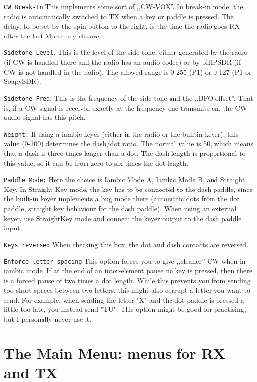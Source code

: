\documentclass[12pt]{book}
\def\rett#1{\texttt{\color{red}#1}}
\begin{document}
\rett{CW Break-In} This implements some sort of ,,CW-VOX''. In
break-in mode, the radio is automatically switched to TX when
a key or paddle is pressed. The delay, to be set by the spin
button to the right, is the time the radio goes RX after the
last Morse key closure.

\rett{Sidetone Level}. This is the level of the side tone,
either generated by the radio (if CW is handled there and the radio
has an audio codec) or
by piHPSDR (if CW is not handled in the radio). The allowed range
is 0-255 (P1) or 0-127 (P1 or SoapySDR).

\rett{Sidetone Freq}. This is the frequency of the side tone and the
,,BFO offset''. That is, if a CW signal is received exactly at the
frequency one transmits on, the CW audio signal has this pitch.

\rett{Weight:} If using a iambic keyer (either in the radio or
the builtin keyer), this value (0-100) determines the dash/dot ratio.
The normal value is 50, which means that a dash is three times longer
than a dot. The dash length is proportional to this value, so it can
be from zero to six times the dot length.

\rett{Paddle Mode:} Here the choice is Iambic Mode A, Iambic Mode B,
and  Straight Key. In Straight Key mode, the key has to be connected
to the dash paddle, since the built-in keyer implements a bug mode
there (automatic dots from the dot paddle, straight key behaviour
for the dash paddle). When using an external keyer, use StraightKey
mode and connect the keyer output to the dash paddle input.

\rett{Keys reversed} When checking this box, the dot and dash contacts
are reversed.

\rett{Enforce letter spacing} This option forces you to give ,,cleaner'' CW
when in iambic mode. If at the end of an inter-element pause no key is
pressed, then there is a forced pause of two times a dot length. While this
prevents you from sending too short spaces between two letters, this
might also corrupt a letter you want to send. For example, when sending
the letter "X" and the dot paddle is pressed a little too late, you
instead send "TU". This option might be good for practising, but
I personally never use it.

\chapter{The Main Menu: menus for RX and TX}
\end{document}
